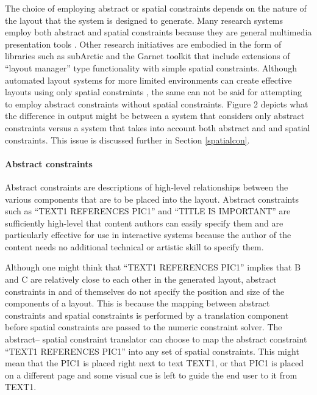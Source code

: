      The choice of employing abstract or spatial constraints depends on the
     nature of the layout that the system is designed to generate. Many research
     systems employ both abstract and spatial constraints because they are
     general multimedia presentation tools \citep{feiner-1,weitzman-2,graf-1}.
     Other research initiatives are embodied in the form of libraries such as
     subArctic \citep{hudson-3,hudson-1} and the Garnet toolkit \citep{myers-2}
     that include extensions of “layout manager” type functionality with simple
     spatial constraints. Although automated layout systems for more limited
     environments can create effective layouts using only spatial constraints
     \citep{kosak-1}, the same can not be said for attempting to employ abstract
     constraints without spatial constraints. Figure 2 depicts what the
     difference in output might be between a system that considers only abstract
     constraints versus a system that takes into account both abstract and and
     spatial constraints. This issue is discussed further in Section
     \ref{spatialcon}.

     \paragraph{Abstract constraints}

      Abstract constraints are descriptions of high-level relationships between
      the various components that are to be placed into the layout. Abstract
      constraints such as “TEXT1 REFERENCES PIC1” and “TITLE IS IMPORTANT” are
      sufficiently high-level that content authors can easily specify them and
      are particularly effective for use in interactive systems because the
      author of the content needs no additional technical or artistic skill to
      specify them.

      Although one might think that “TEXT1 REFERENCES PIC1” implies that B and C
      are relatively close to each other in the generated layout, abstract
      constraints in and of themselves do not specify the position and size of
      the components of a layout. This is because the mapping between abstract
      constraints and spatial constraints is performed by a translation component
      before spatial constraints are passed to the numeric constraint solver. The
      abstract– spatial constraint translator can choose to map the abstract
      constraint “TEXT1 REFERENCES PIC1” into any set of spatial constraints.
      This might mean that the PIC1 is placed right next to text TEXT1, or that
      PIC1 is placed on a different page and some visual cue is left to guide the
      end user to it from TEXT1.

